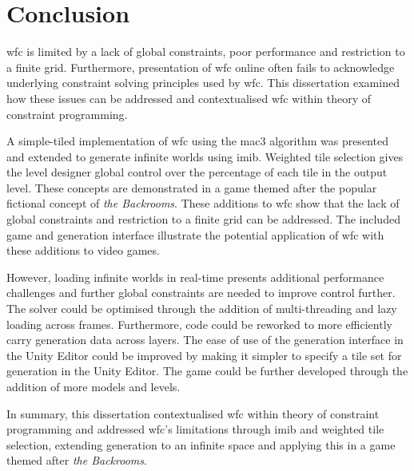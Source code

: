 \chapter{Conclusion}

\acrfull{wfc} is limited by a lack of global constraints, poor performance and restriction to a finite grid. Furthermore, presentation of \acrshort{wfc} online often fails to acknowledge underlying constraint solving principles used by \acrshort{wfc}. This dissertation examined how these issues can be addressed and contextualised \acrshort{wfc} within theory of constraint programming.

A simple-tiled implementation of \acrshort{wfc} using the \acrfull{mac3} algorithm was presented and extended to generate infinite worlds using \acrfull{imib}. Weighted tile selection gives the level designer global control over the percentage of each tile in the output level. These concepts are demonstrated in a game themed after the popular fictional concept of \textit{the Backrooms}. These additions to \acrshort{wfc} show that the lack of global constraints and restriction to a finite grid can be addressed. The included game and generation interface illustrate the potential application of \acrshort{wfc} with these additions to video games.

However, loading infinite worlds in real-time presents additional performance challenges and further global constraints are needed to improve control further. The solver could be optimised through the addition of multi-threading and lazy loading across frames. Furthermore, code could be reworked to more efficiently carry generation data across layers. The ease of use of the generation interface in the Unity Editor could be improved by making it simpler to specify a tile set for generation in the Unity Editor. The game could be further developed through the addition of more models and levels.

In summary, this dissertation contextualised \acrshort{wfc} within theory of constraint programming and addressed \acrshort{wfc}'s limitations through \acrshort{imib} and weighted tile selection, extending generation to an infinite space and applying this in a game themed after \textit{the Backrooms}.

